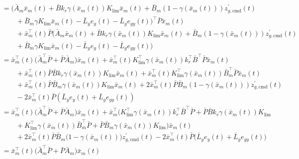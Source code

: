 \begin{proof-dan}
\begin{equation}
\begin{split}
      &=
      \bigr(\bar{A}_{m}\bar{x}_{m}(t) + \bar{B}k_{r}\gamma(\bar{x}_{m}(t)) K_{\text{lim}}\bar{x}_{m}(t) + \bar{B}_{m}(1-\gamma(\bar{x}_{m}(t)))z_{g,\text{cmd}}^{\prime}(t) \\
      &\qquad
      +\bar{B}_{m}\gamma K_{\text{lim}}\bar{x}_{m}(t) - \bar{L}_{y}e_{y}(t) - \bar{L}_{g}e_{gy}(t)\bigr)^{\top}\bar{P}\bar{x}_{m}(t) \\
      &\qquad
      + \bar{x}_{m}^{\top}(t)\bar{P}\bigr(\bar{A}_{m}\bar{x}_{m}(t) + \bar{B}k_{r}\gamma(\bar{x}_{m}(t)) K_{\text{lim}}\bar{x}_{m}(t) + \bar{B}_{m}(1-\gamma(\bar{x}_{m}(t)))z_{g,\text{cmd}}^{\prime}(t) \\
      &\qquad
      + \bar{B}_{m}\gamma K_{\text{lim}}\bar{x}_{m}(t) - \bar{L}_{y}e_{y}(t) - \bar{L}_{g}e_{gy}(t)\bigr) \\
      &=
      \bar{x}_{m}^{\top}(t)\bigr(\bar{A}_{m}^{\top}\bar{P}+\bar{P}\bar{A}_{m}\bigr)\bar{x}_{m}(t)
      +\bar{x}_{m}^{\top}(t)K_{\text{lim}}^{\top}\gamma(\bar{x}_{m}(t)) k_{r}^{\top}\bar{B}^{\top}\bar{P}\bar{x}_{m}(t) \\
      &\qquad
      +\bar{x}_{m}^{\top}(t)\bar{P}\bar{B}k_{r}\gamma(\bar{x}_{m}(t)) K_{\text{lim}}\bar{x}_{m}(t)
      +\bar{x}_{m}^{\top}(t)K_{\text{lim}}^{\top}\gamma(\bar{x}_{m}(t))\bar{B}_{m}^{\top}\bar{P}\bar{x}_{m}(t) \\
      & \qquad
      +\bar{x}_{m}^{\top}(t)\bar{P}\bar{B}_{m}\gamma(\bar{x}_{m}(t)) K_{\text{lim}}\bar{x}_{m}(t)
      + 2\bar{x}_{m}^{\top}(t)\bar{P}\bar{B}_{m}(1-\gamma(\bar{x}_{m}(t)))z_{g,\text{cmd}}^{\prime}(t) \\
      & \qquad
      - 2\bar{x}_{m}^{\top}(t)\bar{P}(\bar{L}_{y}e_{y}(t) + \bar{L}_{g}e_{gy}(t)) \\
      &=
      \bar{x}_{m}^{\top}(t)\bigr(\bar{A}_{m}^{\top}\bar{P}+\bar{P}\bar{A}_{m}\bigr)\bar{x}_{m}(t)
      + \bar{x}_{m}^{\top}\bigr(K_{\text{lim}}^{\top}\gamma(\bar{x}_{m}(t)) k_{r}^{\top}\bar{B}^{\top}\bar{P}
      + \bar{P}\bar{B}k_{r}\gamma(\bar{x}_{m}(t)) K_{\text{lim}} \\
      &\qquad
      + K_{\text{lim}}^{\top}\gamma(\bar{x}_{m}(t))\bar{B}_{m}^{\top}\bar{P}
      +\bar{P}\bar{B}_{m}\gamma(\bar{x}_{m}(t)) K_{\text{lim}}\bigr) \bar{x}_{m}(t) \\
      & \qquad
      + 2\bar{x}_{m}^{\top}(t)\bar{P}\bar{B}_{m}\bigr(1-\gamma(\bar{x}_{m}(t))\bigr)z_{g,\text{cmd}}^{\prime}(t)
      - 2\bar{x}_{m}^{\top}(t)\bar{P}\bigr(\bar{L}_{y}e_{y}(t) + \bar{L}_{g}e_{gy}(t)\bigr) \\
      &=
      \bar{x}_{m}^{\top}(t)\bigr(\bar{A}_{m}^{\top}\bar{P}+\bar{P}\bar{A}_{m}\bigr)\bar{x}_{m}(t)

\end{split}
\end{equation}
\end{proof-dan}
